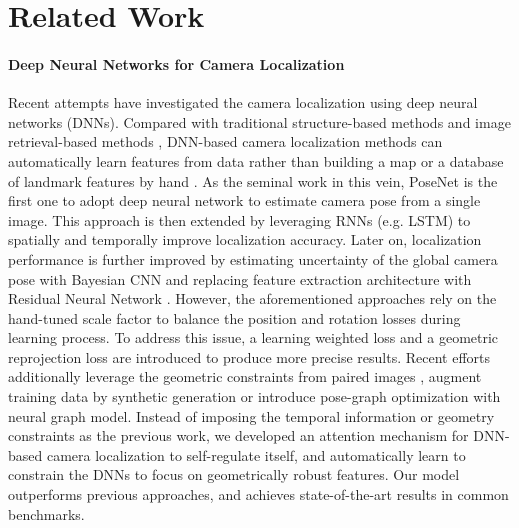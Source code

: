 \documentclass[letterpaper]{article}
\begin{document}
\section{Related Work}
\paragraph{Deep Neural Networks for Camera Localization}
Recent attempts have investigated the camera localization using deep neural networks (DNNs). Compared with traditional structure-based methods \cite{chen2011city,liu2017efficient} and image retrieval-based methods \cite{sattler2012improving,arandjelovic2016netvlad}, DNN-based camera localization methods can automatically learn features from data rather than building a map or a database of landmark features by hand \cite{sattler2019understanding}.
As the seminal work in this vein, PoseNet\cite{kendall2015posenet} is the first one to adopt deep neural network to estimate camera pose from a single image. This approach is then extended by leveraging RNNs (e.g. LSTM) to spatially \cite{walch2017image,wang2018end} and temporally \cite{clark2017vidloc} improve localization accuracy. Later on, localization performance is further improved by estimating uncertainty of the global camera pose with Bayesian CNN \cite{kendall2016modelling,cai2018hybrid} and replacing feature extraction architecture with Residual Neural Network \cite{melekhov2017image}. 
However, the aforementioned approaches rely on the hand-tuned scale factor to balance the position and rotation losses during learning process. 
To address this issue, a learning weighted loss and a geometric reprojection loss \cite{kendall2017geometric} are introduced to produce more precise results. Recent efforts additionally leverage the geometric constraints from paired images \cite{brahmbhatt2018geometry,huang2019prior}, augment training data by synthetic generation\cite{purkait2018synthetic} or introduce pose-graph optimization with neural graph model\cite{parisotto2018global}. Instead of imposing the temporal information or geometry constraints as the previous work, we developed an attention mechanism for DNN-based camera localization to self-regulate itself, and automatically learn to constrain the DNNs to focus on geometrically robust features. Our model outperforms previous approaches, and achieves state-of-the-art results in common benchmarks.
\end{document}
